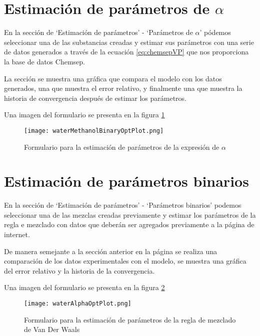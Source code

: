 	
\section{Estimación de parámetros de $\alpha$}\label{sec:webAlphaOptim}
	En la sección de `Estimación de parámetros' - `Parámetros de $\alpha$' pódemos seleccionar una de las substancias creadas y estimar sus parámetros con una serie de datos generados a través de la ecuación \ref{eq:chemsepVP} que nos proporciona la base de datos Chemsep.

	La sección se muestra una gráfica que compara el modelo con los datos generados, una que muestra el error relativo, y finalmente una que muestra la historia de convergencia después de estimar los parámetros.

	Una imagen del formulario se presenta en la figura \ref{fig:alphaOptim}

\begin{figure}
	\texttt{[image: waterMethanolBinaryOptPlot.png]}
	\caption{Formulario para la estimación de parámetros de la expresión de $\alpha$}
	\label{fig:alphaOptim}
\end{figure}


\section{Estimación de parámetros binarios}\label{sec:webBinaryOptim}
	En la sección de `Estimación de parámetros' - `Parámetros binarios' podemos seleccionar una de las mezclas creadas previamente y estimar los parámetros de la regla e mezclado con datos que deberán ser agregados previamente a la página de internet.

	De manera semejante a la sección anterior en la página se realiza una comparación de los datos experimentales con el modelo, se muestra una gráfica del error relativo y la historia de la convergencia.

	Una imagen del formulario se presenta en la figura \ref{fig:binaryOptim}
\begin{figure}
	\texttt{[image: waterAlphaOptPlot.png]}
	\caption{Formulario para la estimación de parámetros de la regla de mezclado de Van Der Waals}
	\label{fig:binaryOptim}
\end{figure}



